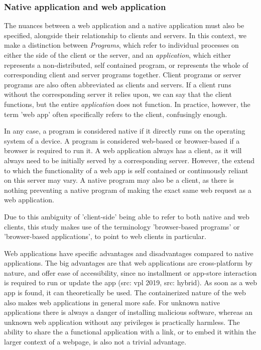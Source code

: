 \subsubsection*{Native application and web application}

The nuances between a web application and a native application must also be specified, alongside their relationship to clients and servers. 
In this context, we make a distinction between \emph{Programs}, which refer to individual processes on either the side of the client or the server, and an \emph{application}, which either represents a non-distributed, self contained program, or represents the whole of corresponding client and server programs together.
Client programs or server programs are also often abbreviated as clients and servers.  
If a client runs without the corresponding server it relies upon, we can say that the client functions, but the entire \emph{application} does not function. 
In practice, however, the term 'web app' often specifically refers to the client, confusingly enough.

In any case, a program is considered native if it directly runs on the operating system of a device.
A program is considered web-based or browser-based if a browser is required to run it. 
A web application always has a client, as it will always need to be initially served by a corresponding server.
However, the extend to which the functionality of a web app is self contained or continuously reliant on this server may vary.
A native program may also be a client, as there is nothing preventing a native program of making the exact same web request as a web application. 

Due to this ambiguity of 'client-side' being able to refer to both native and web clients, this study makes use of the terminology 'browser-based programs' or 'browser-based applications', to point to web clients in particular. 

Web applications have specific advantages and disadvantages compared to native applications. 
The big advantages are that web applications are cross-platform by nature, and offer ease of accessibility, since no installment or app-store interaction is required to run or update the app (src: vpl 2019, src: hybrid).
As soon as a web app is found, it can theoretically be used.
The containerized nature of the web also makes web applications in general more safe. 
For unknown native applications there is always a danger of installing malicious software, whereas an unknown web application without any privileges is practically harmless. 
The ability to share the a functional application with a link, or to embed it within the larger context of a webpage, is also not a trivial advantage.

